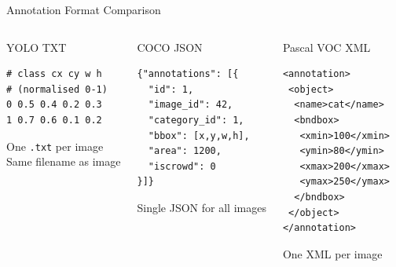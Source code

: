 \documentclass[aspectratio=169]{beamer}
\begin{document}
\begin{frame}[fragile]{Annotation Format Comparison}
  \begin{columns}
    \begin{block}{YOLO TXT}
\begin{lstlisting}
# class cx cy w h
# (normalised 0-1)
0 0.5 0.4 0.2 0.3
1 0.7 0.6 0.1 0.2
\end{lstlisting}
    One \texttt{.txt} per image\\
    Same filename as image
    \end{block}
    \begin{block}{COCO JSON}
\begin{lstlisting}
{"annotations": [{
  "id": 1,
  "image_id": 42,
  "category_id": 1,
  "bbox": [x,y,w,h],
  "area": 1200,
  "iscrowd": 0
}]}
\end{lstlisting}
    Single JSON for all images
    \end{block}
    \begin{block}{Pascal VOC XML}
\begin{lstlisting}
<annotation>
 <object>
  <name>cat</name>
  <bndbox>
   <xmin>100</xmin>
   <ymin>80</ymin>
   <xmax>200</xmax>
   <ymax>250</ymax>
  </bndbox>
 </object>
</annotation>
\end{lstlisting}
    One XML per image
    \end{block}
  \end{columns}
\end{frame}
\end{document}
